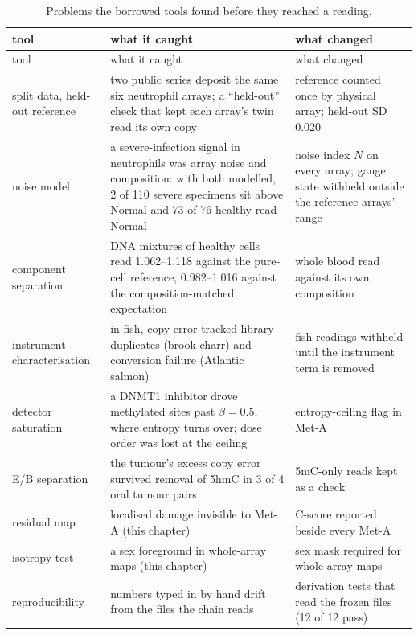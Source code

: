 \begin{center}\small
\begin{longtable}{@{}p{}p{}p{}@{}}
\caption{Problems the borrowed tools found before they reached a reading.}\label{tab:caught}\\
\toprule tool & what it caught & what changed \\\midrule\endfirsthead
\toprule tool & what it caught & what changed \\\midrule\endhead
split data, held-out reference & two public series deposit the same six neutrophil arrays; a ``held-out'' check that kept each array's twin
read its own copy & reference counted once by physical array; held-out SD 0.020 \\
noise model & a severe-infection signal in neutrophils was array noise and composition: with both modelled, 2 of 110 severe specimens sit above Normal
and 73 of 76 healthy read Normal & noise index $N$ on every array; gauge state withheld outside the reference arrays' range \\
component separation & DNA mixtures of healthy cells read 1.062--1.118 against the pure-cell reference, 0.982--1.016 against the
composition-matched expectation & whole blood read against its own composition \\
instrument characterisation & in fish, copy error tracked library duplicates (brook charr) and conversion failure (Atlantic salmon) & fish
readings withheld until the instrument term is removed \\
detector saturation & a DNMT1 inhibitor drove methylated sites past $\beta=0.5$, where entropy turns over; dose order was lost at the
ceiling & entropy-ceiling flag in Met-A \\
E/B separation & the tumour's excess copy error survived removal of 5hmC in 3 of 4 oral tumour pairs & 5mC-only reads kept as a check \\
residual map & localised damage invisible to Met-A (this chapter) & C-score reported beside every Met-A \\
isotropy test & a sex foreground in whole-array maps (this chapter) & sex mask required for whole-array maps \\
reproducibility & numbers typed in by hand drift from the files the chain reads & derivation tests that read the frozen files
(12 of 12 pass) \\\bottomrule
\end{longtable}
\end{center}

